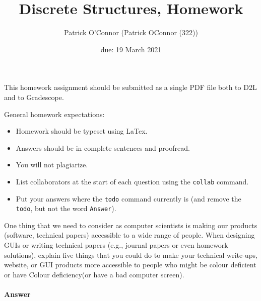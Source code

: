 \documentclass{article}
\title{Discrete Structures, Homework \hwnum}
\author{Patrick O'Connor (Patrick OConnor (322))}
\date{due: 19 March 2021}
\begin{document}
\maketitle

This homework assignment should be
submitted as a single PDF file both to D2L and to Gradescope.

General homework expectations:
\begin{itemize}
    \item Homework should be typeset using LaTex.
    \item Answers should be in complete sentences and proofread.
    \item You will not plagiarize.
    \item List collaborators at the start of each question using the \texttt{collab} command.
    \item Put your answers where the \texttt{todo} command currently is (and
        remove the \texttt{todo}, but not the word \texttt{Answer}).
\end{itemize}


 

One thing that we need to consider as computer scientists is making our products
(software, technical papers) accessible to a wide range of people. When
designing GUIs or writing technical papers (e.g., journal papers or even
homework solutions), explain five things that you could do to make your
technical write-ups, website, or GUI products more accessible to people who
might be colour deficient or have Colour deficiency(or have a bad computer screen).


\paragraph{Answer}
\end{document}
